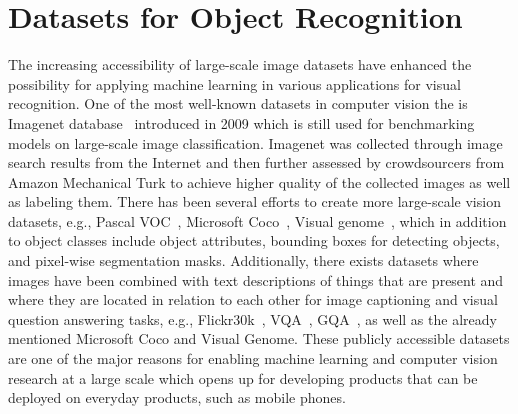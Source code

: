 
\section{Datasets for Object Recognition} %
\label{sec:datasets_for_object_recognition}

The increasing accessibility of large-scale image datasets have enhanced the possibility for applying machine learning in various applications for visual recognition. One of the most well-known datasets in computer vision the is Imagenet database~\cite{deng2009imagenet} introduced in 2009 which is still used for benchmarking models on large-scale image classification. Imagenet was collected through image search results from the Internet and then further assessed by crowdsourcers from Amazon Mechanical Turk to achieve higher quality of the collected images as well as labeling them. There has been several efforts to create more large-scale vision datasets, e.g., Pascal VOC~\cite{everingham2015pascal}, Microsoft Coco~\cite{lin2014microsoft}, Visual genome~\cite{krishna2017visual}, which in addition to object classes include object attributes, bounding boxes for detecting objects, and pixel-wise segmentation masks. Additionally, there exists datasets where images have been combined with text descriptions of things that are present and where they are located in relation to each other for image captioning and visual question answering tasks, e.g., Flickr30k~\cite{young2014image}, VQA~\cite{antol2015vqa}, GQA~\cite{hudson2019gqa}, as well as the already mentioned Microsoft Coco and Visual Genome. These publicly accessible datasets are one of the major reasons for enabling machine learning and computer vision research at a large scale which opens up for developing products that can be deployed on everyday products, such as mobile phones. 


